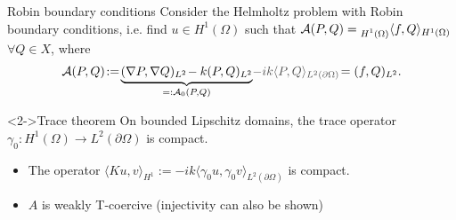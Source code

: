 \documentclass[]{beamer}
\newcommand{\oxarrow}{\color{oxfordblue}$\blacktriangleright$}
\begin{document}
	\begin{frame}{Robin boundary conditions}
	\vspace{0.8cm}
	Consider the Helmholtz problem with Robin boundary conditions, i.e. find $u \in H^1(\Omega)$ such that $\mathcal{A}(P,Q) = \prescript{}{H^1(\Omega)}{\langle} f,Q \rangle_{H^1(\Omega)}$ $\forall Q \in X$, where
	\begin{equation*}
		\mathcal{A}(P,Q)\!:=\! \underbrace{(\nabla P, \nabla Q)_{L^2} \!- k (P,Q)_{L^2}}_{=: \mathcal{A}_0(P,Q)} {\color{gray!60!black} \!- ik \langle P, Q \rangle_{L^2(\partial \Omega)}}\! = (f , Q)_{L^2}.
	\end{equation*}
	\vspace{-0.5cm}
	\begin{block}<2->{Trace theorem}
		On bounded Lipschitz domains, the trace operator $\gamma_0 : H^1(\Omega) \to L^2(\partial \Omega)$ is compact. 
	\end{block}
	\begin{itemize}
		\item<3->[\oxarrow] The operator $\langle Ku, v \rangle_{H^1} := - i k \langle \gamma_0 u, \gamma_0 v \rangle_{L^2(\partial \Omega)}$ is compact. \\
		\item<4->[\oxarrow] $A$ is weakly T-coercive (injectivity can also be shown)
	\end{itemize}
	\end{frame}
	 
\end{document}
